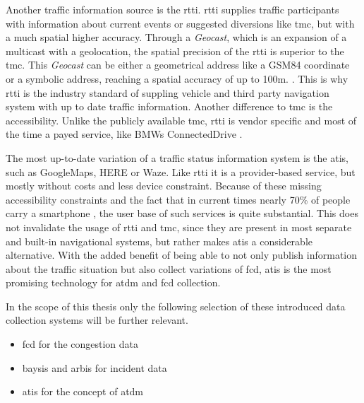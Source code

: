 Another traffic information source is the \acrshort{rtti}. \acrshort{rtti} supplies traffic participants with information about current events or suggested diversions like \acrfull{tmc}, but with a much spatial higher accuracy. Through a \textit{Geocast}, which is an expansion of a multicast with a geolocation, the spatial precision of the \acrshort{rtti} is superior to the \acrshort{tmc}. This \textit{Geocast} can be either a geometrical address like a GSM84 coordinate or a symbolic address, reaching a spatial accuracy of up to 100m.  \parencite{LAPID2020,HindenDeering2006,ImielinskiNavas1996}. This is why \acrshort{rtti} is the industry standard of suppling vehicle and third party navigation system with up to date traffic information. Another difference to \acrshort{tmc} is the accessibility. Unlike the publicly available \acrshort{tmc}, \acrshort{rtti} is vendor specific and most of the time a payed service, like BMWs ConnectedDrive \parencite{BMW2020}. 


The most up-to-date variation of a traffic status information system is the \acrfull{atis}, such as GoogleMaps, HERE or Waze. Like \acrshort{rtti} it is a provider-based service, but mostly without costs and less device constraint. Because of these missing accessibility constraints and the fact that in current times nearly 70\% of people carry a smartphone \parencite{IZM2020}, the user base of such services is quite substantial. This does not invalidate the usage of \acrshort{rtti} and \acrshort{tmc}, since they are present in most separate and built-in navigational systems, but rather makes \acrshort{atis} a considerable alternative. With the added benefit of being able to not only publish information about the traffic situation but also collect variations of \acrshort{fcd}, \acrshort{atis} is the most promising technology for \acrshort{atdm} and \acrshort{fcd} collection. 

\bigskip

In the scope of this thesis only the following  selection of these introduced data collection systems will be further relevant. 
\begin{itemize}
  \item \acrshort{fcd} for the congestion data
  \item \acrshort{baysis} and \acrshort{arbis} for incident data
  \item \acrshort{atis} for the concept of \acrshort{atdm}
\end{itemize}

